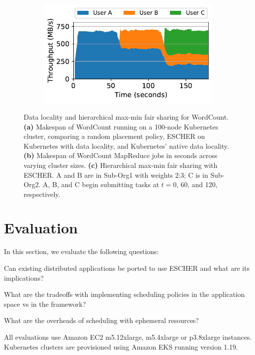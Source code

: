 \begin{figure}[t]
\begin{subfigure}[b]{0.30\textwidth}
 \includegraphics[width=\textwidth]{escher/plots/hfs/3user_hfs_sharing_mapreduce_50nodes_area_short.pdf}
 \caption{}
 \label{fig:hfs-3user-result}
\end{subfigure}
\vspace{-2em}
\caption{
Data locality and hierarchical max-min fair sharing for WordCount.
\textbf{(a)} Makespan of WordCount running on a 100-node Kubernetes cluster, comparing a random placement policy, ESCHER on Kubernetes with data locality, and Kubernetes' native data locality.
\textbf{(b)} Makespan of WordCount MapReduce jobs in seconds across varying cluster sizes.
\textbf{(c)} Hierarchical max-min fair sharing with ESCHER.
A and B are in Sub-Org1 with weights 2:3; C is in Sub-Org2.
A, B, and C begin submitting tasks at $t=$0, 60, and 120, respectively.
}
\vspace{-3mm}
\end{figure}


\section{Evaluation}
\label{sec:eval}

In this section, we evaluate the following questions:
\begin{compactitem}
    \item Can existing distributed applications be ported to use ESCHER and what are its implications?
    \item What are the tradeoffs with implementing scheduling policies in the application space vs in the framework?
    \item What are the overheads of scheduling with ephemeral resources?
\end{compactitem}

All evaluations use Amazon EC2 m5.12xlarge, m5.4xlarge or p3.8xlarge instances. Kubernetes clusters are provisioned using Amazon EKS running version 1.19.

